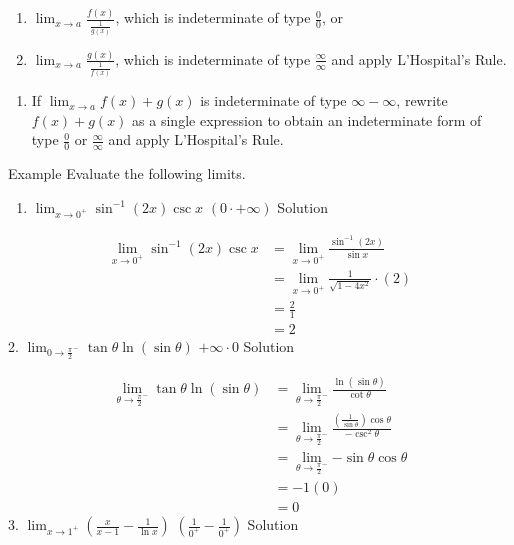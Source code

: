 \documentclass[
  letterpaper,
  DIV=11,
  numbers=noendperiod]{scrartcl}
\providecommand{\tightlist}{%
  \setlength{\itemsep}{0pt}\setlength{\parskip}{0pt}}\usepackage{longtable,booktabs,array}
\begin{document}
\begin{enumerate}
\def\labelenumi{(\alph{enumi})}
\tightlist
\item
  \(\displaystyle\lim_{x\to a}{\frac{f(x)}{\frac{1}{g(x)}}}\), which is
  indeterminate of type \(\frac{0}{0}\), or
\item
  \(\displaystyle\lim_{x\to a}{\frac{g(x)}{\frac{1}{f(x)}}}\), which is
  indeterminate of type \(\frac{\infty}{\infty}\) and apply L'Hospital's
  Rule.
\end{enumerate}

\begin{enumerate}
\def\labelenumi{\arabic{enumi}.}
\setcounter{enumi}{1}
\tightlist
\item
  If \(\displaystyle\lim_{x\to a}{f(x)+g(x)}\) is indeterminate of type
  \(\infty - \infty\), rewrite \(f(x)+g(x)\) as a single expression to
  obtain an indeterminate form of type \(\frac{0}{0}\) or
  \(\frac{\infty}{\infty}\) and apply L'Hospital's Rule.
\end{enumerate}

\leavevmode{}%
Example Evaluate the following limits.

\begin{enumerate}
\def\labelenumi{\arabic{enumi}.}
\tightlist
\item
  \(\displaystyle\lim_{x\to 0^+}{\sin^{-1} (2x) \csc x}\)
  \((0\cdot +\infty)\) Solution
\end{enumerate}

\[
\begin{aligned}
\displaystyle\lim_{x\to 0^+}{\sin^{-1} (2x) \csc x} &=\displaystyle\lim_{x\to 0^+}{\frac{\sin^{-1} (2x)}{\sin x}}\\&=\displaystyle\lim_{x\to 0^+}{\frac{1}{\sqrt{1-4x^2}}}\cdot (2) \\&=\frac{2}{1}\\&=2
\end{aligned}
\] 2.
\(\displaystyle\lim_{0\to \frac{\pi}{2}^-}{\tan \theta \ln (\sin \theta)}\)
\(+\infty \cdot 0\) Solution

\[
\begin{aligned}
\displaystyle\lim_{\theta\to \frac{\pi}{2}^-}{\tan \theta \ln (\sin \theta)}&=\displaystyle\lim_{\theta \to \frac{\pi}{2}^-}{\frac {\ln (\sin \theta)}{\cot \theta}}\\&=\displaystyle\lim_{\theta\to \frac{\pi}{2}^-}{\frac{\left(\frac {1}{\sin \theta}\right)\cos \theta}{-\csc^2 \theta}}\\&=\displaystyle\lim_{\theta\to \frac{\pi}{2}^-}{-\sin \theta\cos \theta}\\&=-1(0)\\&=0
\end{aligned}
\] 3.
\(\displaystyle\lim_{x\to 1^+}{\left(\frac{x}{x-1}-\frac{1}{\ln x}\right)}\)
\(\left(\frac{1}{0^+}-\frac{1}{0^+}\right)\) Solution
\end{document}
